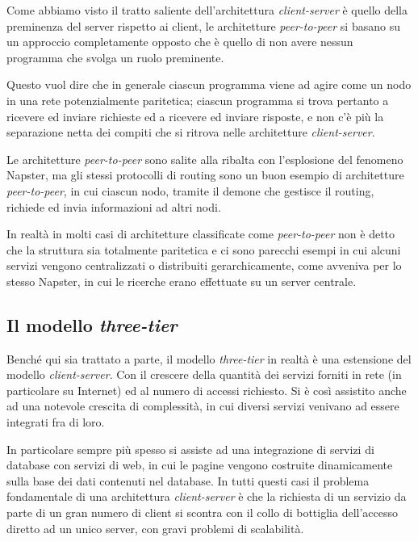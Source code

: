 Come abbiamo visto il tratto saliente dell'architettura \textit{client-server}
è quello della preminenza del server rispetto ai client, le architetture
\textit{peer-to-peer} si basano su un approccio completamente opposto che è
quello di non avere nessun programma che svolga un ruolo preminente.

Questo vuol dire che in generale ciascun programma viene ad agire come un nodo
in una rete potenzialmente paritetica; ciascun programma si trova pertanto a
ricevere ed inviare richieste ed a ricevere ed inviare risposte, e non c'è più
la separazione netta dei compiti che si ritrova nelle architetture
\textit{client-server}.

Le architetture \textit{peer-to-peer} sono salite alla ribalta con
l'esplosione del fenomeno Napster, ma gli stessi protocolli di routing sono un
buon esempio di architetture \textit{peer-to-peer}, in cui ciascun nodo,
tramite il demone che gestisce il routing, richiede ed invia informazioni ad
altri nodi.

In realtà in molti casi di architetture classificate come
\textit{peer-to-peer} non è detto che la struttura sia totalmente paritetica e
ci sono parecchi esempi in cui alcuni servizi vengono centralizzati o
distribuiti gerarchicamente, come avveniva per lo stesso Napster, in cui le
ricerche erano effettuate su un server centrale.



\subsection{Il modello \textit{three-tier}}
\label{sec:net_three_tier}

Benché qui sia trattato a parte, il modello \textit{three-tier} in realtà è
una estensione del modello \textit{client-server}. Con il crescere della
quantità dei servizi forniti in rete (in particolare su Internet) ed al numero
di accessi richiesto. Si è così assistito anche ad una notevole crescita di
complessità, in cui diversi servizi venivano ad essere integrati fra di loro.

In particolare sempre più spesso si assiste ad una integrazione di servizi di
database con servizi di web, in cui le pagine vengono costruite dinamicamente
sulla base dei dati contenuti nel database. In tutti questi casi il problema
fondamentale di una architettura \textit{client-server} è che la richiesta di
un servizio da parte di un gran numero di client si scontra con il collo di
bottiglia dell'accesso diretto ad un unico server, con gravi problemi di
scalabilità.


